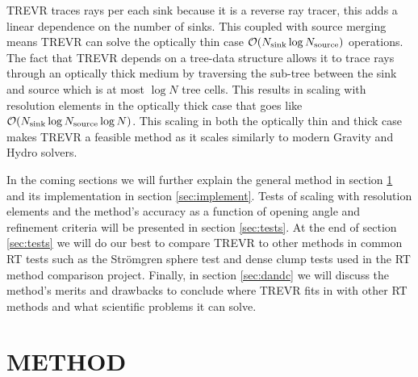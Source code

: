 \documentclass[fleqn,usenatbib]{mnras}
\newcommand{\acro}{TREVR}
\begin{document}
\acro{} traces rays per each sink because it is a reverse ray tracer, this 
adds a linear dependence on the number of sinks. This coupled with source 
merging means \acro{} can solve the optically thin case 
$\mathcal{O}(N_{\rm sink} \log N_{\rm source})$ operations. The fact that
 \acro{} depends on a tree-data structure allows it to trace rays through an 
optically thick medium by traversing the sub-tree between the sink and source 
which is at most $\log N$ tree cells. This results in scaling with resolution
 elements in the optically thick case that goes like 
$\mathcal{O}(N_{\rm sink} \log N_{\rm source} \log N)$. This scaling in both 
the optically thin and thick case makes \acro{} a feasible method as it scales 
similarly to modern Gravity and Hydro solvers.

In the coming sections we will further explain the general method in section 
\ref{sec:method} and its implementation in section \ref{sec:implement}. Tests 
of scaling with resolution elements and the method's accuracy as a function of 
opening angle and refinement criteria will be presented in section 
\ref{sec:tests}. At the end of section \ref{sec:tests} we will do our best to 
compare \acro{} to other methods in common RT tests such as the Str\"{o}mgren
 sphere test and dense clump tests used in the \cite{ilievEt06} RT method 
comparison project. Finally, in section \ref{sec:dandc} we will discuss the 
method's merits and drawbacks to conclude where \acro{} fits in with other RT 
methods and what scientific problems it can solve.



\section{METHOD}\label{sec:method}
\end{document}
